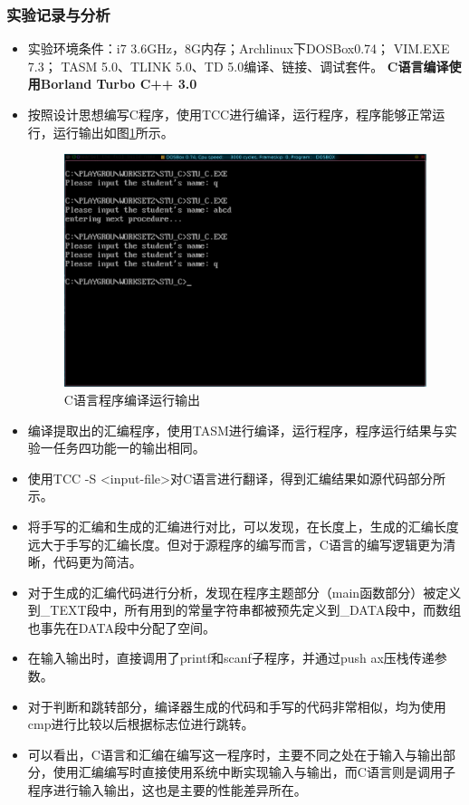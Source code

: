 \documentclass{article}
\begin{document}
	\subsubsection{实验记录与分析}
	\begin{itemize}
		\item 实验环境条件：i7 3.6GHz，8G内存；Archlinux下DOSBox0.74； VIM.EXE 7.3； TASM 5.0、TLINK 5.0、TD 5.0编译、链接、调试套件。 {\textbf{C语言编译使用Borland Turbo C++ 3.0}}
		\item 按照设计思想编写C程序，使用TCC进行编译，运行程序，程序能够正常运行，运行输出如图\ref{fig:output1}所示。
			\begin{figure}[h]
				\centering
				\includegraphics[width=0.9\linewidth]{res/homework_2/output1.png}
				\caption{C语言程序编译运行输出}
				\label{fig:output1}
			\end{figure}
		\item 编译提取出的汇编程序，使用TASM进行编译，运行程序，程序运行结果与实验一任务四功能一的输出相同。
		\item 使用TCC -S <input-file>对C语言进行翻译，得到汇编结果如源代码部分所示。
		\item 将手写的汇编和生成的汇编进行对比，可以发现，在长度上，生成的汇编长度远大于手写的汇编长度。但对于源程序的编写而言，C语言的编写逻辑更为清晰，代码更为简洁。
		\item 对于生成的汇编代码进行分析，发现在程序主题部分（main函数部分）被定义到\_TEXT段中，所有用到的常量字符串都被预先定义到\_DATA段中，而数组也事先在DATA段中分配了空间。
		\item 在输入输出时，直接调用了printf和scanf子程序，并通过push ax压栈传递参数。
		\item 对于判断和跳转部分，编译器生成的代码和手写的代码非常相似，均为使用cmp进行比较以后根据标志位进行跳转。
		\item 可以看出，C语言和汇编在编写这一程序时，主要不同之处在于输入与输出部分，使用汇编编写时直接使用系统中断实现输入与输出，而C语言则是调用子程序进行输入输出，这也是主要的性能差异所在。
	\end{itemize}
\end{document}
